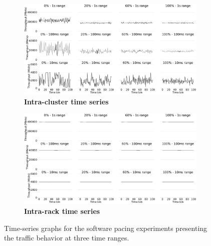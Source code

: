 \begin{figure}[th!]
	\centering
	\begin{subfigure}[t]{0.75\linewidth}
	\centering\includegraphics[width=1\linewidth]{figs/intra_cluster_byte_time_series.pdf}
    \caption{\small{\textbf{Intra-cluster time series}}}
    \label{fig:app-pacing-ts-cluster}
    \end{subfigure}
    	\begin{subfigure}[t]{0.75\linewidth}
	\centering\includegraphics[width=1\linewidth]{figs/intra_rack_byte_time_series.pdf}
    \caption{\small{\textbf{Intra-rack time series}}}
    \label{fig:app-pacing-ts-rack}
    \end{subfigure}
    \caption{\small{Time-series graphs for the software pacing experiments presenting the traffic behavior at three time ranges.}}
        \label{fig:app-pacing-ts}
         \vspace{-2mm}
\end{figure}

